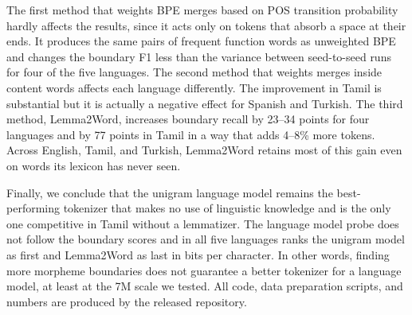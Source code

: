 The first method that weights BPE merges based on POS transition probability hardly affects the results, since it acts only on tokens that absorb a space at their ends.
It produces the same pairs of frequent function words as unweighted BPE and changes the boundary F1 less than the variance between seed-to-seed runs for four of the five languages.
The second method that weights merges inside content words affects each language differently.
The improvement in Tamil is substantial but it is actually a negative effect for Spanish and Turkish.
The third method, Lemma2Word, increases boundary recall by 23--34 points for four languages and by 77 points in Tamil in a way that adds 4--8\% more tokens.
Across English, Tamil, and Turkish, Lemma2Word retains most of this gain even on words its lexicon has never seen.

Finally, we conclude that the unigram language model remains the best-performing tokenizer that makes no use of linguistic knowledge and is the only one competitive in Tamil without a lemmatizer.
The language model probe does not follow the boundary scores and in all five languages ranks the unigram model as first and Lemma2Word as last in bits per character.
In other words, finding more morpheme boundaries does not guarantee a better tokenizer for a language model, at least at the 7M scale we tested.
All code, data preparation scripts, and numbers are produced by the released repository.
